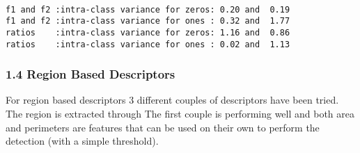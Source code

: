 \documentclass[11pt]{article}
\begin{document}
    \begin{center}
    \end{center}
    { \hspace*{\fill} \\}
    
    \begin{Verbatim}[commandchars=\\\{\}]
f1 and f2 :intra-class variance for zeros: 0.20 and  0.19
f1 and f2 :intra-class variance for ones : 0.32 and  1.77
ratios    :intra-class variance for zeros: 1.16 and  0.86
ratios    :intra-class variance for ones : 0.02 and  1.13

    \end{Verbatim}

    \subsubsection{1.4 Region Based
Descriptors}\label{region-based-descriptors}

For region based descriptors 3 different couples of descriptors have
been tried. The region is extracted through The first couple is
performing well and both area and perimeters are features that can be
used on their own to perform the detection (with a simple threshold).
\end{document}
